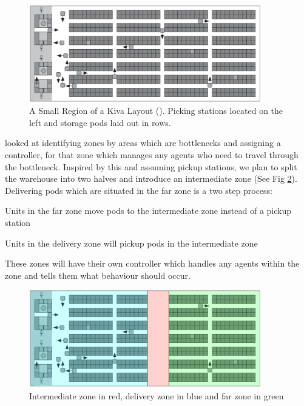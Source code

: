 \documentclass[a4paper,11pt]{article}
\begin{document}
\begin{figure}[h]
	\centering
	\includegraphics[width=0.9\textwidth]{graphics/kivasystemlayout}
	\caption{A Small Region of a Kiva Layout (\cite{wurman2008coordinating}). Picking stations located on the left and storage pods laid out in rows.}
	\label{kivalayout1}
\end{figure}

\cite{wilt2014spatially} looked at identifying zones by areas which are bottlenecks and assigning a controller, for that zone which manages any agents who need to travel through the bottleneck. Inspired by this and assuming pickup stations, we plan to split the warehouse into two halves and introduce an intermediate zone (See Fig \ref{kivalayout2}). Delivering pods which are situated in the far zone is a two step process:
\begin{compactenum}
	\item Units in the far zone move pods to the intermediate zone instead of a pickup station
	\item Units in the delivery zone will pickup pods in the intermediate zone
\end{compactenum}
\noindent These zones will have their own controller which handles any agents within the zone and tells them what behaviour should occur.

\begin{figure}[h]
	\centering
	\includegraphics[width=0.9\textwidth]{graphics/kivasystemlayout_adjusted}
	\caption{Intermediate zone in red, delivery zone in blue and far zone in green}
	\label{kivalayout2}
\end{figure}
\end{document}
